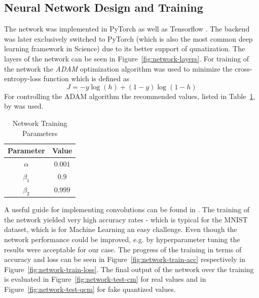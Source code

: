 \subsection{Neural Network Design and Training}
\label{subsec:nntraining}


The network was implemented in PyTorch \cite{Paszke:2019aa} as well as Tensorflow \cite{MartinAbadi:2015aa}. The backend was later exclusively switched to PyTorch (which is also the most common deep learning framework in Science) due to its better support of qunatization. The layers of the network can be seen in Figure~\ref{fig:network-layers}. 
For training of the network the \emph{ADAM} optimization algorithm \cite{Kingma:2014aa} was used to minimize the cross-entropy-loss function which is defined as
\begin{equation}
    J = - y  \log(h) + (1-y)  \log(1-h)
\end{equation}
For controlling the ADAM algorithm the recommended values, listed in Table~\ref{tab:train-params}, by \cite{Kingma:2014aa} was used.
\begin{table}[ht]
	\centering
    \caption{Network Training Parameters}
    \begin{tabular}{cc}
        \toprule
            Parameter & Value \\
        \midrule
            $\alpha$   & $0.001$ \\
            $\beta_1$  & $0.9$   \\
            $\beta_2$  & $0.999$  \\          
        \bottomrule
    \end{tabular}
    \label{tab:train-params}
\end{table}


A useful guide for implementing convolutions can be found in \cite{dumoulin2016guide}. The training 
of the network yielded very high accuracy rates - which is typical for the MNIST dataset, which is for
Machine Learning an easy challenge. Even though the network performance could be improved, e.g. by 
hyperparameter tuning the results were acceptable for our case. The progress of the training in terms
of accuracy and loss can be seen in Figure~\ref{fig:network-train-acc} respectively in Figure~\ref{fig:network-train-loss}.
The final output of the network over the training is evaluated in Figure~\ref{fig:network-test-cm} for real
values and in Figure~\ref{fig:network-test-qcm} for fake quantized values.

